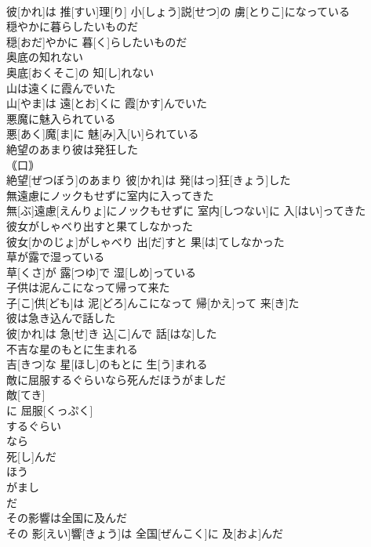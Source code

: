 \documentclass[8pt]{extreport}
\begin{document}
\begin{CJK}{UTF8}{min}
\\	彼[かれ]は 推[すい]理[り] 小[しょう]説[せつ]の 虜[とりこ]になっている
\\	穏やかに暮らしたいものだ	
\\	穏[おだ]やかに 暮[く]らしたいものだ
\\	奥底の知れない	
\\	奥底[おくそこ]の 知[し]れない
\\	山は遠くに霞んでいた	
\\	山[やま]は 遠[とお]くに 霞[かす]んでいた
\\	悪魔に魅入られている	
\\	悪[あく]魔[ま]に 魅[み]入[い]られている
\\	絶望のあまり彼は発狂した	
\\	｟口｠
\\	絶望[ぜつぼう]のあまり 彼[かれ]は 発[はっ]狂[きょう]した
\\	無遠慮にノックもせずに室内に入ってきた	
\\	無[ぶ]遠慮[えんりょ]にノックもせずに 室内[しつない]に 入[はい]ってきた
\\	彼女がしゃべり出すと果てしなかった	
\\	彼女[かのじょ]がしゃべり 出[だ]すと 果[は]てしなかった
\\	草が露で湿っている	
\\	草[くさ]が 露[つゆ]で 湿[しめ]っている
\\	子供は泥んこになって帰って来た	
\\	子[こ]供[ども]は 泥[どろ]んこになって 帰[かえ]って 来[き]た
\\	彼は急き込んで話した	
\\	彼[かれ]は 急[せ]き 込[こ]んで 話[はな]した
\\	不吉な星のもとに生まれる	
\\	[｟文語｠
\\	不[ふ]吉[きつ]な 星[ほし]のもとに 生[う]まれる
\\	敵に屈服するぐらいなら死んだほうがましだ	
\\	敵[てき]
\\	に 屈服[くっぷく]
\\	するぐらい 
\\	なら 
\\	死[し]んだ 
\\	ほう 
\\	がまし 
\\	だ
\\	その影響は全国に及んだ	
\\	その 影[えい]響[きょう]は 全国[ぜんこく]に 及[およ]んだ

\end{CJK}
\end{document}
